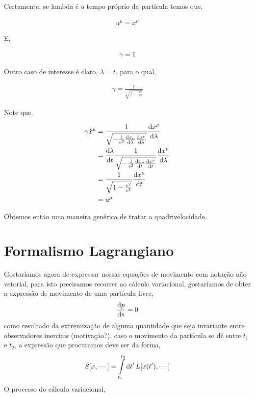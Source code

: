 \documentclass[twoside]{amsart}
\numberwithin{equation}{section}
\begin{document}
Certamente, se lambda é o tempo próprio da partícula temos que,

\begin{align}
    u^\mu=\dot{x}^\mu
\end{align}

E,

\begin{align}
    \gamma=1
\end{align}

Outro caso de interesse é claro, $\lambda=t$, para o qual,

\begin{align}
    \gamma=\frac{1}{\sqrt{1-\frac{v^2}{c^2}}}
\end{align}

Note que,

\begin{align}
    \gamma \dot{x}^\mu&=\frac{1}{\sqrt{-\frac{1}{c^2}\dv{x_\nu}{\lambda}\dv{x^\nu}{\lambda}}}\dv{x^\mu}{\lambda}\\
    &=\dv{\lambda}{t}\frac{1}{\sqrt{-\frac{1}{c^2}\dv{x_\nu}{t}\dv{x^\nu}{t}}}\dv{x^\mu}{\lambda}\\
    &=\frac{1}{\sqrt{1-\frac{v^2}{c^2}}}\dv{x^\mu}{t}\\
    &=u^\mu
\end{align}

Obtemos então uma maneira genérica de tratar a quadrivelocidade.



\section{Formalismo Lagrangiano}

Gostaríamos agora de expressar nossas equações de movimento com notação não vetorial, para isto precisamos recorrer ao cálculo variacional, gostaríamos de obter a expressão de movimento de uma partícula livre, $$\dv{p}{s}=0$$ como resultado da extremização de alguma quantidade que seja invariante entre observadores inerciais (motivação?), caso o movimento da partícula se dê entre $t_1$ e $t_2$, a expressão que procuramos deve ser da forma, $$S[x,\cdots]=\int\limits_{t_1}^{t_2}\dd{t'}L\qty[x\qty(t'),\cdots]$$ O processo do cálculo variacional,
\end{document}
